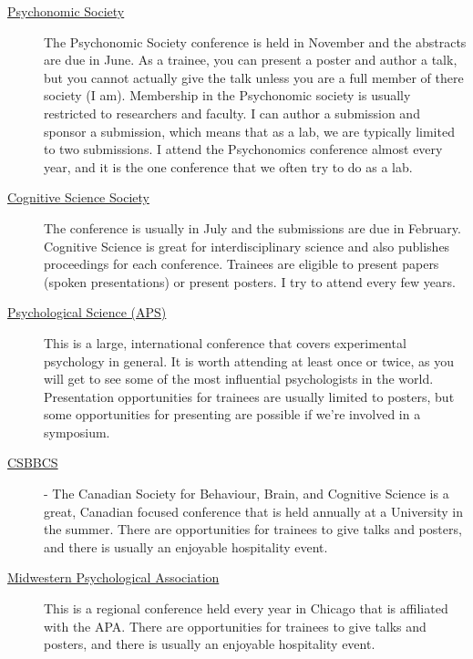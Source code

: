\documentclass{article}
\begin{document}
\begin{description}
\item [\href{http://www.psychonomic.org}{Psychonomic Society} ] The Psychonomic Society conference is held in November and the abstracts are due in June. As a trainee, you can present a poster and author a talk, but you cannot actually give the talk unless you are a full member of there society (I am). Membership in the Psychonomic society is usually restricted to researchers and faculty. I can author a submission and sponsor a submission, which means that as a lab, we are typically limited to two submissions. I attend the Psychonomics conference almost every year, and it is the one conference that we often try to do as a lab.

\item [\href{http://www.cognitivesciencesociety.org/}{Cognitive Science Society}] The conference is usually in July and the submissions are due in February. Cognitive Science is great for interdisciplinary science and also publishes proceedings for each conference. Trainees are eligible to present papers (spoken presentations) or present posters. I try to attend every few years.

\item  [\href{http://www.psychologicalscience.org/conventions/annual}{Psychological Science (APS)}] This is a large, international conference that covers experimental psychology in general. It is worth attending at least once or twice, as you will get to see some of the most influential psychologists in the world. Presentation opportunities for trainees are usually limited to posters, but some opportunities for presenting are possible if we're involved in a symposium.

\item [\href{https://www.csbbcs.org/}{CSBBCS}] - The Canadian Society for Behaviour, Brain, and Cognitive Science is a great, Canadian focused conference that is held annually at a University in the summer. There are opportunities for trainees to give talks and posters, and there is usually an enjoyable hospitality event. 

\item [\href{https://www.midwesternpsych.org/}{Midwestern Psychological Association}] This is a regional conference held every year in Chicago that is affiliated with the APA. There are opportunities for trainees to give talks and posters, and there is usually an enjoyable hospitality event. 

\end{description}
\end{document}
